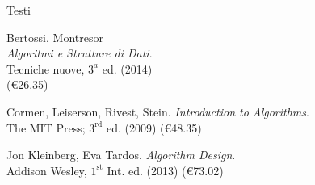 \begin{frame}{Testi}


\begin{myboxtitle}
\BI
\item Bertossi, Montresor\\
\alert{\emph{Algoritmi e Strutture di Dati}}. \\
Tecniche nuove, $3^a$ ed. (2014)\\
(\euro 26.35)
\EI
\end{myboxtitle}

\begin{myboxtitle}[Approfondimenti]
\BI
\item Cormen, Leiserson, Rivest, Stein. \alert{\emph{Introduction to Algorithms}}. \\The MIT Press; $3^{\textrm{rd}}$ ed. (2009) (\euro 48.35)
\item Jon Kleinberg, Eva Tardos. \alert{\emph{Algorithm Design}}. \\Addison Wesley, $1^{\textrm{st}}$ Int. ed. (2013) (\euro 73.02)
\EI
\end{myboxtitle}


\end{frame}
